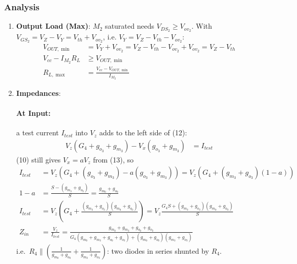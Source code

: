\subsubsection{Analysis}
\begin{enumerate}
  \item \textbf{Output Load (Max)}: \(M_2\) saturated needs
    \(V_{DS_2} \geq V_{ov_2}\). With \(V_{GS_2} = V_Z - V_Y = V_{th} + V_{ov_2}\), i.e.
    \(V_Y = V_Z - V_{th} - V_{ov_2}\):
    \begin{align*}
      V_{OUT,\min} &= V_Y + V_{ov_2} = V_Z - V_{th} - V_{ov_2} + V_{ov_2} = V_Z - V_{th} \\
      V_{cc} - I_{M_2} R_{L} &\geq V_{OUT,\min} \\
      R_{L, \max} &= \frac{V_{cc} - V_{OUT,\min}}{I_{M_2}}
    \end{align*}
  \item \textbf{Impedances}:
    \paragraph{At Input:} a test current \(I_{test}\) into \(V_z\) adds to the
    left side of (12):
      \begin{align*}
        V_{z}(G_4 + g_{o_3} + g_{m_3}) - V_{x}(g_{o_3} + g_{m_3}) &= I_{test} \tag{15}
      \end{align*}
      (10) still gives \(V_x = a V_z\) from (13), so
      \begin{align*}
        I_{test} &= V_z\left(G_4 + (g_{o_3} + g_{m_3}) - a(g_{o_3} + g_{m_3})\right) = V_z\left(G_4 + (g_{m_3} + g_{o_3})(1 - a)\right) \\
        1 - a &= \frac{S - (g_{m_3} + g_{o_3})}{S} = \frac{g_{m_0} + g_{o_0}}{S} \\
        I_{test} &= V_z\left(G_4 + \frac{(g_{m_3} + g_{o_3})(g_{m_0} + g_{o_0})}{S}\right) = V_z\frac{G_4 S + (g_{m_3} + g_{o_3})(g_{m_0} + g_{o_0})}{S} \\
        Z_{in} &= \frac{V_{z}}{I_{test}} = \frac{g_{m_0} + g_{m_3} + g_{o_0} + g_{o_3}}{G_{4}(g_{m_0} + g_{m_3} + g_{o_0} + g_{o_3}) + (g_{m_0} + g_{o_0})(g_{m_3} + g_{o_3})}
      \end{align*}
      i.e.\ \(R_4 \parallel \left(\frac{1}{g_{m_0} + g_{o_0}} + \frac{1}{g_{m_3} + g_{o_3}}\right)\): two diodes in series
      shunted by \(R_4\).

\end{enumerate}
